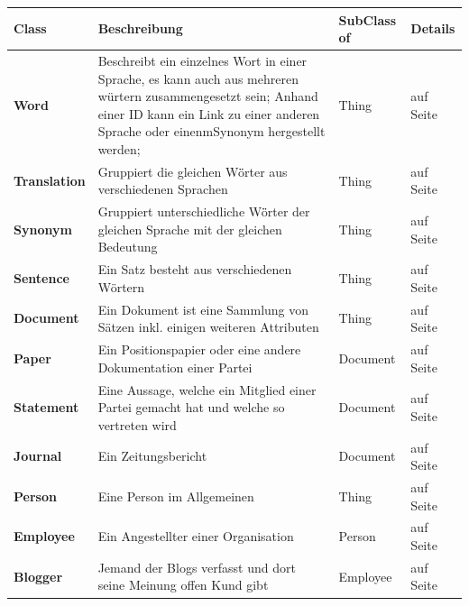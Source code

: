 ﻿\documentclass[
    11pt,
    latin1,
    a4paper,
    oneside
]{scrreprt}
\begin{document}
\begin{table}[h]
	\centering
	\begin{tabular}{ | l | p{5cm} | l | l| }
		\hline
		\textbf{Class} & \textbf{Beschreibung} & \textbf{SubClass of} & \textbf{Details} \\ \hline
		\textbf{Word} & Beschreibt ein einzelnes Wort in einer Sprache, es kann auch aus mehreren würtern zusammengesetzt sein; Anhand einer ID kann ein Link zu einer anderen Sprache oder einenmSynonym hergestellt werden; & Thing & \nameref{sec:class_word} auf Seite \pageref{sec:class_word} \\ \hline
		\textbf{Translation} & Gruppiert die gleichen W\"örter aus verschiedenen Sprachen & Thing & \nameref{sec:class_translation} auf Seite \pageref{sec:class_translation} \\ \hline
		\textbf{Synonym} & Gruppiert unterschiedliche W\"örter der gleichen Sprache mit der gleichen Bedeutung & Thing & \nameref{sec:class_synonym} auf Seite \pageref{sec:class_synonym} \\ \hline
		\textbf{Sentence} & Ein Satz besteht aus verschiedenen Wörtern & Thing & \nameref{sec:class_sentence} auf Seite \pageref{sec:class_sentence} \\ \hline
		\textbf{Document} & Ein Dokument ist eine Sammlung von Sätzen inkl. einigen weiteren Attributen & Thing & \nameref{sec:class_document} auf Seite \pageref{sec:class_document} \\ \hline
		\textbf{Paper} & Ein Positionspapier oder eine andere Dokumentation einer Partei & Document & \nameref{sec:class_paper} auf Seite \pageref{sec:class_paper} \\ \hline
		\textbf{Statement} & Eine Aussage, welche ein Mitglied einer Partei gemacht hat und welche so vertreten wird & Document & \nameref{sec:class_statement} auf Seite \pageref{sec:class_statement} \\ \hline
		\textbf{Journal} & Ein Zeitungsbericht & Document & \nameref{sec:class_journal} auf Seite \pageref{sec:class_journal} \\ \hline
		\textbf{Person} & Eine Person im Allgemeinen & Thing & \nameref{sec:class_person} auf Seite \pageref{sec:class_person} \\ \hline
		\textbf{Employee} & Ein Angestellter einer Organisation & Person & \nameref{sec:class_employee} auf Seite \pageref{sec:class_employee} \\ \hline
		\textbf{Blogger} & Jemand der Blogs verfasst und dort seine Meinung offen Kund gibt & Employee & \nameref{sec:class_blogger} auf Seite \pageref{sec:class_blogger} \\ \hline

\end{tabular}
\end{table}
\end{document}
